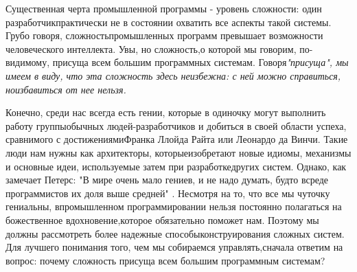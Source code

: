 \documentclass[10pt]{article}
\begin{document}
Существенная черта промышленной программы - уровень сложности: один разработчик\linebreak  практически не в состоянии охватить все аспекты такой системы. Грубо говоря, сложность\linebreak  промышленных программ превышает возможности человеческого интеллекта. Увы, но сложность,\linebreak  о которой мы говорим, по-видимому, присуща всем большим программных системам. Говоря\linebreak \it "присуща"\rm, мы имеем в виду, что эта сложность здесь неизбежна: с ней можно справиться, но\linebreak  избавиться от нее нельзя. \vspace{3mm}

Конечно, среди нас всегда есть гении, которые в одиночку могут выполнить работу группы\linebreak  обычных людей-разработчиков и добиться в своей области успеха, сравнимого с достижениями\linebreak  Франка Ллойда Райта или Леонардо да Винчи. Такие люди нам нужны как архитекторы, которые\linebreak  изобретают новые идиомы, механизмы и основные идеи, используемые затем при разработке\linebreak  других систем. Однако, как замечает Петерс: "В мире очень мало гениев, и не надо думать, будто в\linebreak  среде программистов их доля выше средней" \cite{Peter}. Несмотря на то, что все мы чуточку гениальны, в\linebreak  промышленном программировании нельзя постоянно полагаться на божественное вдохновение,\linebreak  которое обязательно поможет нам. Поэтому мы должны рассмотреть более надежные способы\linebreak  конструирования сложных систем. Для лучшего понимания того, чем мы собираемся управлять,\linebreak  сначала ответим на вопрос: почему сложность присуща всем большим программным системам? 
\end{document}
